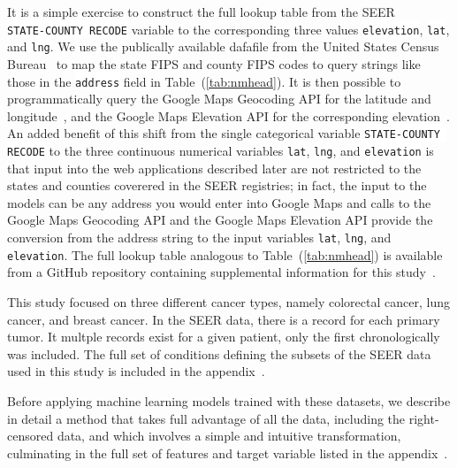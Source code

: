 \documentclass[10pt,letterpaper]{article}
\newcommand{\codewhite}[1]{\colorbox{white}{\texttt{#1}}}
\begin{document}
It is a simple exercise to construct the full lookup table from the SEER \\  \codewhite{STATE-COUNTY RECODE} variable to the corresponding three values \codewhite{elevation}, \codewhite{lat}, and \codewhite{lng}. We use the publically available dafafile from the United States Census Bureau~\cite{census} to map the state FIPS and county FIPS codes to query strings like those in the \codewhite{address} field in Table~(\ref{tab:nmhead}). 
It is then possible to programmatically query the Google Maps Geocoding API for the latitude and longitude~\cite{geocode}, and the Google Maps Elevation API for the corresponding elevation~\cite{elevation}.
An added benefit of this shift from the single categorical variable \codewhite{STATE-COUNTY RECODE} to the three continuous numerical variables \codewhite{lat}, \codewhite{lng}, and \codewhite{elevation} is that input into the web applications described later are not restricted to the states and counties coverered in the SEER registries; in fact, the input to the models can be any address you would enter into Google Maps and calls to the Google Maps Geocoding API and the Google Maps Elevation API provide the conversion from the address string to the input variables \codewhite{lat}, \codewhite{lng}, and \codewhite{elevation}. The full lookup table analogous to Table~(\ref{tab:nmhead}) is available from a GitHub repository containing supplemental information for this study~\cite{supp}. 


This study focused on three different cancer types, namely colorectal cancer, lung cancer, and breast cancer. 
In the SEER data, there is a record for each primary tumor. It multple records exist for a given patient, only the first chronologically was included. The full set of conditions defining the subsets of the SEER data used in this study is included in the appendix~.













Before applying machine learning models trained with these datasets, we describe in detail a method that takes full advantage of all the data, including the right-censored data, and which involves a simple and intuitive transformation, culminating in the full set of features and target variable listed in the appendix~. 
\end{document}
